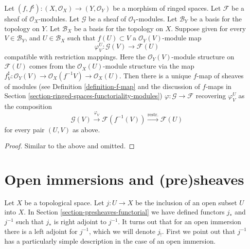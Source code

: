 \begin{lemma}
\label{lemma-f-map-basis-above-and-below-modules}
Let $(f, f^\sharp) : (X, \mathcal{O}_X) \to (Y, \mathcal{O}_Y)$
be a morphism of ringed spaces.
Let $\mathcal{F}$ be a sheaf of $\mathcal{O}_X$-modules.
Let $\mathcal{G}$ be a sheaf of $\mathcal{O}_Y$-modules.
Let $\mathcal{B}_Y$ be a basis for the topology on $Y$.
Let $\mathcal{B}_X$ be a basis for the topology on $X$.
Suppose given for every $V \in \mathcal{B}_Y$, and
$U \in \mathcal{B}_X$ such that $f(U) \subset V$ a
$\mathcal{O}_Y(V)$-module map
$$
\varphi_V^U :
\mathcal{G}(V)
\longrightarrow
\mathcal{F}(U)
$$
compatible with restriction mappings. Here the
$\mathcal{O}_Y(V)$-module structure on $\mathcal{F}(U)$
comes from the $\mathcal{O}_X(U)$-module structure
via the map $f^\sharp_V : \mathcal{O}_Y(V)
\to \mathcal{O}_X(f^{-1}V) \to \mathcal{O}_X(U)$.
Then there is a unique $f$-map of sheaves of modules (see
Definition \ref{definition-f-map} and the discussion
of $f$-maps in Section \ref{section-ringed-spaces-functoriality-modules})
$\varphi : \mathcal{G} \to \mathcal{F}$
recovering $\varphi_V^U$ as the composition
$$
\mathcal{G}(V) \xrightarrow{\varphi_V}
\mathcal{F}(f^{-1}(V)) \xrightarrow{\text{restr.}}
\mathcal{F}(U)
$$
for every pair $(U, V)$ as above.
\end{lemma}

\begin{proof}
Similar to the above and omitted.
\end{proof}

\section{Open immersions and (pre)sheaves}
\label{section-open-immersions}

\noindent
Let $X$ be a topological space.
Let $j : U \to X$ be the inclusion of an open subset $U$ into $X$.
In Section \ref{section-presheaves-functorial} we have defined
functors $j_*$ and $j^{-1}$ such that $j_*$ is right adjoint to
$j^{-1}$. It turns out that for an open immersion there is a left adjoint
for $j^{-1}$, which we will denote $j_!$. First we point out that
$j^{-1}$ has a particularly simple description in the case of
an open immersion.


